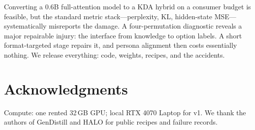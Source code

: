\documentclass[11pt]{article}
\begin{document}
Converting a 0.6B full-attention model to a KDA hybrid on a consumer
budget is feasible, but the standard metric stack---perplexity, KL,
hidden-state MSE---systematically misreports the damage. A
four-permutation diagnostic reveals a major repairable injury: the
interface from knowledge to option labels. A short format-targeted
stage repairs it, and persona alignment then costs essentially nothing.
We release everything: code, weights, recipes, and the accidents.

\section*{Acknowledgments}

Compute: one rented 32\,GB GPU; local RTX 4070 Laptop for v1. We thank
the authors of GenDistill and HALO for public recipes and failure
records.


\end{document}
